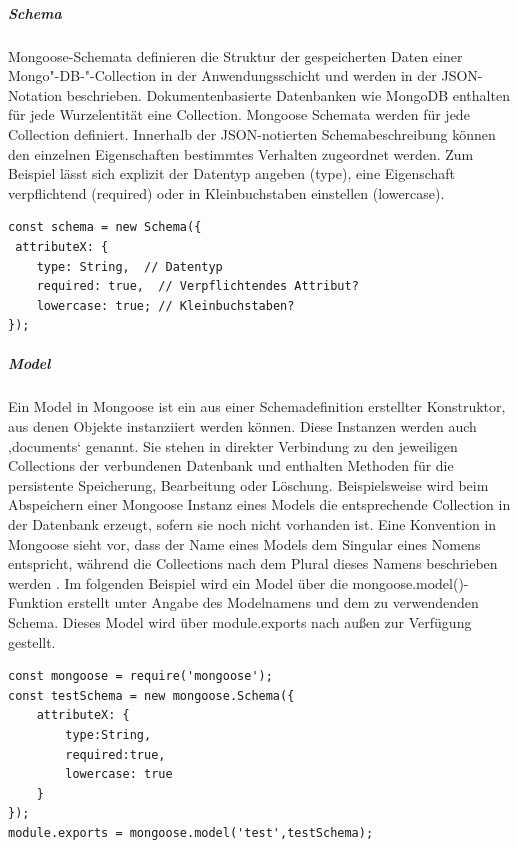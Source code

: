 %
%
%

\noindent
\subparagraph{Schema}
Mongoose-Schemata definieren die Struktur der gespeicherten Daten einer Mongo"-DB-"-Collection in der Anwendungsschicht und werden in der JSON-Notation beschrieben. Dokumentenbasierte Datenbanken wie MongoDB enthalten für jede Wurzelentität eine Collection. Mongoose Schemata werden für jede Collection definiert. Innerhalb der JSON-notierten Schemabeschreibung können den einzelnen Eigenschaften bestimmtes Verhalten zugeordnet werden. Zum Beispiel lässt sich explizit der Datentyp angeben (type), eine Eigenschaft verpflichtend (required) oder in Kleinbuchstaben einstellen (lowercase).
\newline


\begin{lstlisting}[caption=Mongoose Schema - Beispiel,label=lst:MongooseSchema]
const schema = new Schema({
 attributeX: {
 	type: String,  // Datentyp
 	required: true,  // Verpflichtendes Attribut?
 	lowercase: true; // Kleinbuchstaben?
});
\end{lstlisting}

%
%
%

\newpage
\noindent
\subparagraph{Model}
Ein Model in Mongoose ist ein aus einer Schemadefinition erstellter Konstruktor, aus denen Objekte instanziiert werden können. Diese Instanzen werden auch ‚documents‘ genannt. Sie stehen in direkter Verbindung zu den jeweiligen Collections der verbundenen Datenbank und enthalten Methoden für die persistente Speicherung, Bearbeitung oder Löschung. Beispielsweise wird beim Abspeichern einer Mongoose Instanz eines Models die entsprechende Collection in der Datenbank erzeugt, sofern sie noch nicht vorhanden ist. Eine Konvention in Mongoose sieht vor, dass der Name eines Models dem Singular eines Nomens entspricht, während die Collections nach dem Plural dieses Namens beschrieben werden \cite{Node3.2}. Im folgenden Beispiel wird ein Model über die mongoose.model()-Funktion erstellt unter Angabe des Modelnamens und dem zu verwendenden Schema. Dieses Model wird über module.exports nach außen zur Verfügung gestellt.

\begin{lstlisting}[caption=Model erstellen und exportierenn,label=lst:MongooseObjectExport]
const mongoose = require('mongoose');
const testSchema = new mongoose.Schema({
	attributeX: {
		type:String,
		required:true,
		lowercase: true
	}
});
module.exports = mongoose.model('test',testSchema);
\end{lstlisting}

